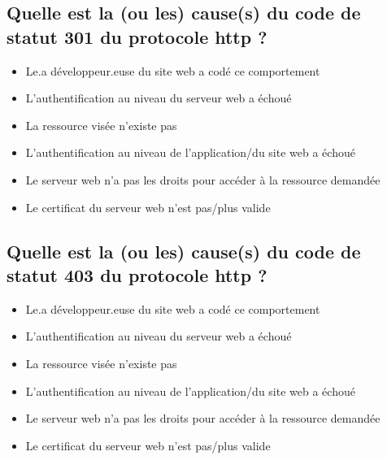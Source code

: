\documentclass[11pt,a4paper]{article}
\begin{document}
\subsection{Quelle est la (ou les) cause(s) du code de statut 301 du protocole http ?} %

\begin{itemize}
\item[\CaseCoche] Le.a développeur.euse du site web a codé ce comportement\\  %
\item[\CaseCoche] L'authentification au niveau du serveur web a échoué\\
\item[\CaseCoche] La ressource visée n'existe pas\\
\item[\CaseCoche] L'authentification au niveau de l'application/du site web a échoué\\
\item[\CaseCoche] Le serveur web n'a pas les droits pour accéder à la ressource demandée\\
\item[\CaseCoche] Le certificat du serveur web n'est pas/plus valide\\
\end{itemize}


\subsection{Quelle est la (ou les) cause(s) du code de statut 403 du protocole http ?}

\begin{itemize}
\item[\CaseCoche] Le.a développeur.euse du site web a codé ce comportement\\  %
\item[\CaseCoche] L'authentification au niveau du serveur web a échoué\\  %
\item[\CaseCoche] La ressource visée n'existe pas\\
\item[\CaseCoche] L'authentification au niveau de l'application/du site web a échoué\\
\item[\CaseCoche] Le serveur web n'a pas les droits pour accéder à la ressource demandée\\  %
\item[\CaseCoche] Le certificat du serveur web n'est pas/plus valide\\
\end{itemize}
\end{document}
